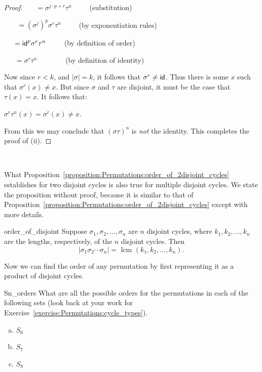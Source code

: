 \begin{proof}
~~~$=  \sigma^{j \cdot p + r} \tau^n$~~~~~(substitution)

~~~ $=  (\sigma^j)^p \sigma^r \tau^n $~~~~~(by exponentiation rules)

~~~$=   {\sf{i}d} ^p \sigma^r \tau^n $~~~~~(by definition of order)

~~~$=   \sigma^r \tau^n $~~~~~~~~(by definition of identity)
\medskip

Now since $r < k$, and $|\sigma| = k$,  it follows that $\sigma^r \neq {\sf{i}d} $. Thus there is some $x$ such that $\sigma^r(x) \neq x$. But since $\sigma$ and $\tau$ are disjoint, it must be the case that $\tau(x) = x$. It follows that:
\medskip

$\sigma^r \tau^n (x) = \sigma^r (x) \neq x$. 
\medskip

\noindent
From this we may conclude that $(\sigma \tau )^n$ is \emph{not} the identity. This completes the proof of (ii).
\end{proof}\
\medskip

What Proposition~\ref{proposition:Permutations:order_of_2disjoint_cycles} establishes for two disjoint cycles is also true for multiple disjoint cycles. We state the proposition without proof, because it is similar to that of Proposition~\ref{proposition:Permutations:order_of_2disjoint_cycles} except with more details.

\begin{prop}{order_of_disjoint}
Suppose $\sigma_1, \sigma_2, \ldots , \sigma_n$ are $n$ disjoint cycles, where $k_1, k_2, \ldots, k_n$ are the lengths, respectively, of the $n$ disjoint cycles.  Then 
\[
|\sigma_1 \sigma_2  \cdots \sigma_n| = \mbox{ lcm }(k_1, k_2, \ldots, k_n). \]
\end{prop}

\noindent
Now we can find the order of any permutation by first representing it as a product of disjoint cycles.

\begin{exercise}{Sn_orders}
What are all the possible orders for the permutations in each of the following sets (look back at your work for Exercise~\ref{exercise:Permutations:cycle_types}).
\begin{multicols}{3}
\begin{enumerate}[(a)]
\item
$S_6$
\item
$S_7$
\item
$S_8$
\end{enumerate}
\end{multicols}
\end{exercise}

